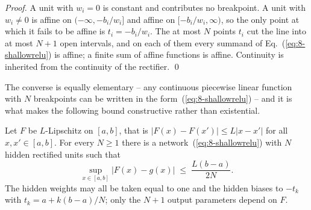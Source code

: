 \begin{proof}
A unit with $w_i=0$ is constant and contributes no breakpoint.  A unit with
$w_i\neq0$ is affine on $(-\infty,-b_i/w_i]$ and affine on
$[-b_i/w_i,\infty)$, so the only point at which it fails to be affine is
$t_i=-b_i/w_i$.  The at most $N$ points $t_i$ cut the line into at most $N+1$
open intervals, and on each of them every summand of
Eq.~(\ref{eq:8-shallowrelu}) is affine; a finite sum of affine functions is
affine.  Continuity is inherited from the continuity of the rectifier.
\qed
\end{proof}

The converse is equally elementary -- any continuous piecewise linear function
with $N$ breakpoints can be written in the form~(\ref{eq:8-shallowrelu}) -- and
it is what makes the following bound constructive rather than existential.

\begin{theorem}
\label{thm:8-relurate}
Let $F$ be $L$-Lipschitz on $[a,b]$, that is $|F(x)-F(x')|\le L|x-x'|$ for all
$x,x'\in[a,b]$.  For every $N\ge1$ there is a network~(\ref{eq:8-shallowrelu})
with $N$ hidden rectified units such that
\begin{equation}
  \sup_{x\in[a,b]}\left|F(x)-g(x)\right| \;\le\; \frac{L(b-a)}{2N}.
  \label{eq:8-relurate}
\end{equation}
The hidden weights may all be taken equal to one and the hidden biases to
$-t_k$ with $t_k=a+k(b-a)/N$; only the $N+1$ output parameters depend on $F$.
\end{theorem}

